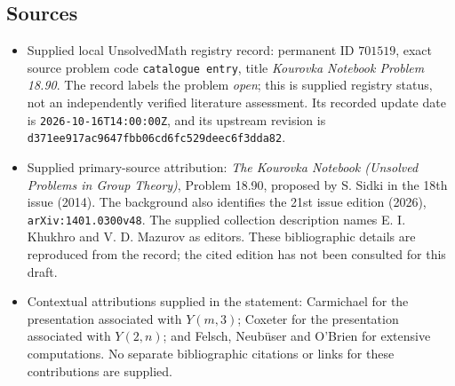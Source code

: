\documentclass[11pt]{article}
\begin{document}
\subsection{Sources}
\begin{itemize}
\item Supplied local UnsolvedMath registry record: permanent ID \(701519\), exact source problem code \texttt{catalogue entry}, title \emph{Kourovka Notebook Problem 18.90}. The record labels the problem \emph{open}; this is supplied registry status, not an independently verified literature assessment. Its recorded update date is \texttt{2026-10-16T14:00:00Z}, and its upstream revision is \texttt{d371ee917ac9647fbb06cd6fc529deec6f3dda82}.
\item Supplied primary-source attribution: \emph{The Kourovka Notebook (Unsolved Problems in Group Theory)}, Problem 18.90, proposed by S. Sidki in the 18th issue (2014). The background also identifies the 21st issue edition (2026), \texttt{arXiv:1401.0300v48}. The supplied collection description names E. I. Khukhro and V. D. Mazurov as editors. These bibliographic details are reproduced from the record; the cited edition has not been consulted for this draft.
\item Contextual attributions supplied in the statement: Carmichael for the presentation associated with \(Y(m,3)\); Coxeter for the presentation associated with \(Y(2,n)\); and Felsch, Neub\"user and O'Brien for extensive computations. No separate bibliographic citations or links for these contributions are supplied.
\end{itemize}
\end{document}
